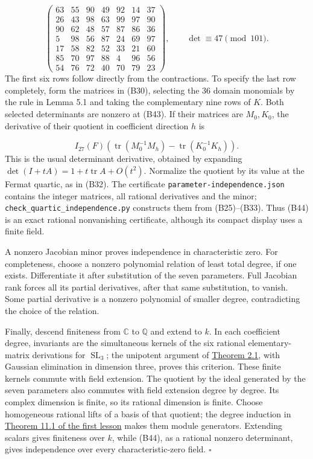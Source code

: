 \documentclass[
]{article}
\begin{document}
\[
\begin{pmatrix}
63&55&90&49&92&14&37\\
26&43&98&63&99&97&90\\
90&62&48&57&87&86&36\\
5&98&56&87&24&69&97\\
17&58&82&52&33&21&60\\
85&70&97&88&4&96&56\\
54&76&72&40&70&79&23
\end{pmatrix},
\qquad\det\equiv47\pmod{101}.
\tag{B44}
\] The first six rows follow directly from the contractions. To specify
the last row completely, form the matrices in (B30), selecting the 36
domain monomials by the rule in Lemma 5.1 and taking the complementary
nine rows of \(K\). Both selected determinants are nonzero at (B43). If
their matrices are \(M_0,K_0\), the derivative of their quotient in
coefficient direction \(h\) is
\protect{}\label{equation-B45}{}

\[
I_{27}(F)\left(\operatorname{tr}(M_0^{-1}M_h)
-\operatorname{tr}(K_0^{-1}K_h)\right).
\tag{B45}
\] This is the usual determinant derivative, obtained by expanding
\(\det(I+tA)=1+t\operatorname{tr}A+O(t^2)\). Normalize the quotient by
its value at the Fermat quartic, as in (B32). The certificate
\texttt{parameter-independence.json} contains the integer matrices, all
rational derivatives and the minor;
\texttt{check\_quartic\_independence.py} constructs them from
(B25)--(B33). Thus (B44) is an exact rational nonvanishing certificate,
although its compact display uses a finite field.

A nonzero Jacobian minor proves independence in characteristic zero. For
completeness, choose a nonzero polynomial relation of least total
degree, if one exists. Differentiate it after substitution of the seven
parameters. Full Jacobian rank forces all its partial derivatives, after
that same substitution, to vanish. Some partial derivative is a nonzero
polynomial of smaller degree, contradicting the choice of the relation.

Finally, descend finiteness from \(\mathbb C\) to \(\mathbb Q\) and
extend to \(k\). In each coefficient degree, invariants are the
simultaneous kernels of the six rational elementary-matrix derivations
for \(\operatorname{SL}_3\); the unipotent argument of
\href{NOE-INV-01.html\#theorem-2-1}{Theorem 2.1}, with Gaussian
elimination in dimension three, proves this criterion. These finite
kernels commute with field extension. The quotient by the ideal
generated by the seven parameters also commutes with field extension
degree by degree. Its complex dimension is finite, so its rational
dimension is finite. Choose homogeneous rational lifts of a basis of
that quotient; the degree induction in
\href{NOE-INV-01.html\#theorem-11-1}{Theorem 11.1 of the first lesson}
makes them module generators. Extending scalars gives finiteness over
\(k\), while (B44), as a rational nonzero determinant, gives
independence over every characteristic-zero field. \(\square\)
\end{document}
